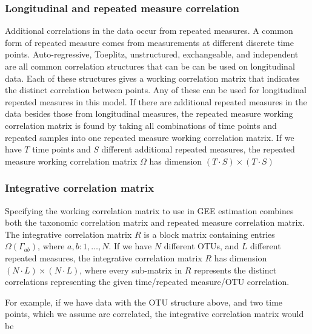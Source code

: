 \documentclass[12pt]{article}
\begin{document}
\subsubsection{Longitudinal and repeated measure correlation}

Additional correlations in the data occur from repeated measures. A common form of repeated measure comes from measurements at different discrete time points. Auto-regressive, Toeplitz, unstructured, exchangeable, and independent are all common correlation structures that can be can be used on longitudinal data. Each of these structures gives a working correlation matrix that indicates the distinct correlation between points. Any of these can be used for longitudinal repeated measures in this model. If there are additional repeated measures in the data besides those from longitudinal measures, the repeated measure working correlation matrix is found by taking all combinations of time points and repeated samples into one repeated measure working correlation matrix. If we have $T$ time points and $S$ different additional repeated measures, the repeated measure working correlation matrix $\Omega$ has dimension $(T \cdot S) \times (T \cdot S ) $

\subsubsection{Integrative correlation matrix }

Specifying the working correlation matrix to use in GEE estimation combines both the taxonomic correlation matrix and repeated measure correlation matrix. The integrative correlation matrix $R$ is a block matrix containing entries $\Omega(\Gamma_{ab})$, where $a,b: 1, \ldots , N$. If we have $N$ different OTUs, and $L$ different repeated measures, the integrative correlation matrix $R$ has dimension $(N \cdot L) \times (N \cdot L)$, where every sub-matrix in $R$ represents the distinct correlations representing the given time/repeated measure/OTU correlation.

For example, if we have data with the OTU structure above, and two time points, which we assume are correlated, the integrative correlation matrix would be
\end{document}
